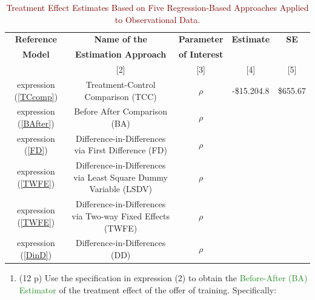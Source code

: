 \documentclass[
]{article}
\providecommand{\tightlist}{%
  \setlength{\itemsep}{0pt}\setlength{\parskip}{0pt}}
\begin{document}
\begin{table}[ht!]
\centering
\colorbox{lightmaroon}{
{\color{Maroon}
\begin{tabular}{ccccc}
\hline
\textbf{Reference} & \multicolumn{1}{c}{\textbf{Name of the }} & \textbf{Parameter} & \multicolumn{1}{c}{\textbf{Estimate}} & \textbf{SE} \\
\textbf{Model} & \multicolumn{1}{c}{\textbf{Estimation Approach}}            & \textbf{of Interest} &  &  \\ \hline
[1] & [2] & [3] & [4] & [5]  \\ \hline
expression (\ref{TCcomp})                 & Treatment-Control Comparison (TCC)                    & $\rho$             & -\$15.204.8  &  \$655.67  \\
expression (\ref{BAfter})                 & Before After Comparison (BA) & $\rho$             &  &  \\
expression (\ref{FD})                 & Difference-in-Differences via First Difference (FD) & $\rho$             &  &  \\
expression (\ref{TWFE})                 & Difference-in-Differences via Least Square Dummy Variable (LSDV) & $\rho$             &  &  \\
expression (\ref{TWFE})                 & Difference-in-Differences via Two-way Fixed Effects (TWFE) & $\rho$             &  &  \\
expression (\ref{DinD})                 & Difference-in-Differences (DD) & $\rho$             &  &  \\
\hline
\end{tabular}}}
\caption{\textcolor{Maroon}{Treatment Effect Estimates Based on Five Regression-Based Approaches Applied to Observational Data.}}
\label{tab:reg-specs}
\end{table}

\newpage

\begin{enumerate}
\def\labelenumi{\arabic{enumi}.}
\tightlist
\item
  (12 p) Use the specification in expression (2) to obtain the
  \textcolor{ForestGreen}{Before-After (BA) Estimator} of the treatment
  effect of the offer of training. Specifically:
\end{enumerate}
\end{document}
